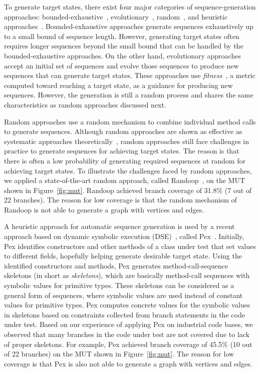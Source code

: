 To generate target states, there exist four major categories of sequence-generation approaches: bounded-exhaustive~\cite{khurshid:symbolic, xie:rostra}, evolutionary~\cite{tonella:etoc,  inkumsah08:improving},  random~\cite{csallner:jcrasher, JTEST, pacheco:feedback}, and heuristic approaches~\cite{tillman:pexwhite}. Bounded-exhaustive approaches generate sequences exhaustively up to a small bound of sequence length. However, generating target states often requires longer sequences beyond the small bound that can be handled by the bounded-exhaustive approaches. On the other hand, evolutionary approaches accept an initial set of sequences and evolve those sequences to produce new sequences that can generate target states. These approaches use \emph{fitness}~\cite{Xiyang:fitness}, a metric computed toward reaching a target state, as a guidance for producing new sequences. However, the generation is still a random process and shares the same characteristics as random approaches discussed next. 

Random approaches use a random mechanism to combine individual method calls to generate sequences. Although random approaches are shown as effective as systematic approaches theoretically~\cite{random:duran}, random approaches still face challenges in practice to generate sequences for achieving target states. The reason is that there is often a low probability of generating required sequences at random for achieving target states. To illustrate the challenges faced by random approaches, we applied a state-of-the-art random approach, called Randoop~\cite{pacheco:feedback}, on the MUT shown in Figure~\ref{fig:mut}. Randoop achieved branch coverage of 31.8\% (7 out of 22 branches). The reason for low coverage is that the random mechanism of Randoop is not able to generate a graph with vertices and edges. 

A heuristic approach for automatic sequence generation is used by a recent approach based on dynamic symbolic execution (DSE)~\cite{king:symex, Clarke:symbolic, godefroid:dart, koushik:cute}, called Pex~\cite{tillman:pexwhite}. Initially, Pex identifies constructors and other methods of a class under test that set values to different fields, hopefully helping generate desirable target state. Using the identified constructors and methods, Pex generates method-call-sequence skeletons (in short as \emph{skeletons}), which are basically method-call sequences with symbolic values for primitive types. These skeletons can be considered as a general form of sequences, where symbolic values are used instead of constant values for primitive types. Pex computes concrete values for the symbolic values in skeletons based on constraints collected from branch statements in the code under test. Based on our experience of applying Pex on industrial code bases, we observed that many branches in the code under test are not covered due to lack of proper skeletons. For example, Pex achieved branch coverage of 45.5\% (10 out of 22 branches) on the MUT shown in Figure~\ref{fig:mut}. The reason for low coverage is that Pex is also not able to generate a graph with vertices and edges.

